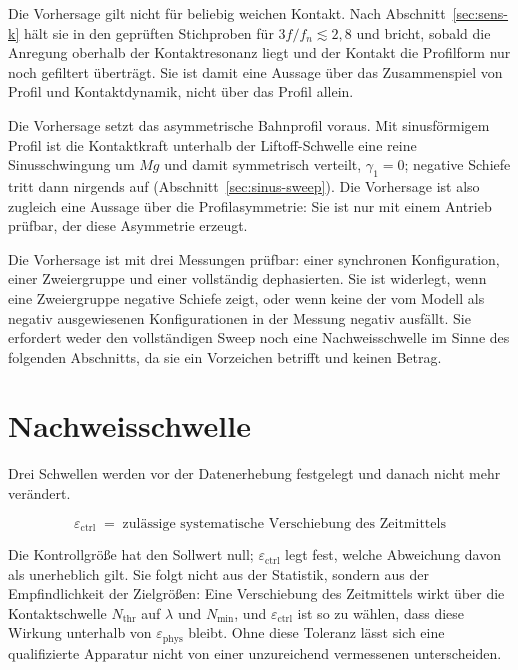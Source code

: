 \documentclass[12pt,a4paper]{report}
\begin{document}
Die Vorhersage gilt nicht für beliebig weichen Kontakt. Nach
Abschnitt~\ref{sec:sens-k} hält sie in den geprüften Stichproben für
$3f/f_n \lesssim 2{,}8$ und bricht, sobald die Anregung oberhalb der
Kontaktresonanz liegt und der Kontakt die Profilform nur noch gefiltert
überträgt. Sie ist damit eine Aussage über das Zusammenspiel
von Profil und Kontaktdynamik, nicht über das Profil allein.

Die Vorhersage setzt das asymmetrische Bahnprofil voraus. Mit
sinusförmigem Profil ist die Kontaktkraft unterhalb der Liftoff-Schwelle
eine reine Sinusschwingung um $Mg$ und damit symmetrisch verteilt,
$\gamma_1 = 0$; negative Schiefe tritt dann nirgends auf
(Abschnitt~\ref{sec:sinus-sweep}). Die Vorhersage ist also zugleich
eine Aussage über die Profilasymmetrie: Sie ist nur mit einem Antrieb
prüfbar, der diese Asymmetrie erzeugt.

Die Vorhersage ist mit drei Messungen prüfbar: einer synchronen
Konfiguration, einer Zweiergruppe und einer vollständig dephasierten. Sie
ist widerlegt, wenn eine Zweiergruppe negative Schiefe zeigt, oder wenn
keine der vom Modell als negativ ausgewiesenen Konfigurationen in der
Messung negativ ausfällt. Sie erfordert weder den vollständigen Sweep
noch eine Nachweisschwelle im Sinne des folgenden Abschnitts, da sie
ein Vorzeichen betrifft und keinen Betrag.

\section{Nachweisschwelle}
\label{sec:threshold}

Drei Schwellen werden vor der Datenerhebung festgelegt und danach nicht
mehr verändert.

\begin{equation}
  \varepsilon_{\mathrm{ctrl}} \;=\;
  \text{zulässige systematische Verschiebung des Zeitmittels}
  \label{eq:eps-ctrl}
\end{equation}

Die Kontrollgröße hat den Sollwert null; $\varepsilon_{\mathrm{ctrl}}$
legt fest, welche Abweichung davon als unerheblich gilt. Sie folgt nicht
aus der Statistik, sondern aus der Empfindlichkeit der Zielgrößen: Eine
Verschiebung des Zeitmittels wirkt über die Kontaktschwelle
$N_{\mathrm{thr}}$ auf $\lambda$ und $N_{\min}$, und
$\varepsilon_{\mathrm{ctrl}}$ ist so zu wählen, dass diese Wirkung
unterhalb von $\varepsilon_{\mathrm{phys}}$ bleibt. Ohne diese Toleranz
lässt sich eine qualifizierte Apparatur nicht von einer unzureichend
vermessenen unterscheiden.
\end{document}
